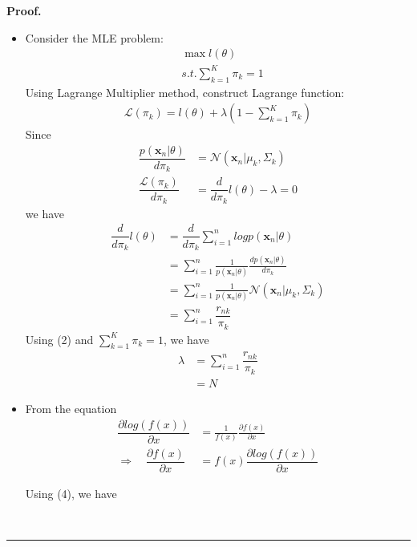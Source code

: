 \documentclass[12pt]{article}%
\newenvironment{proof}[1][Proof]{\textbf{#1.} }{\ \rule{0.5em}{0.5em}}
\begin{document}
\begin{itemize}
\begin{proof}
\begin{itemize}
    		\item Consider the MLE problem:
    		\begin{align*}
    			&\max l(\theta) \\
    			&s.t. \sum_{k=1}^{K} \pi_k=1
    		\end{align*}
    		Using Lagrange Multiplier method, construct Lagrange function:
    		\begin{align*}
    		\mathcal{L}(\pi_k) = l(\theta) + \lambda(1-\sum_{k=1}^{K}\pi_k) 
    		\end{align*}
    		Since 
    		\begin{align}
    		\dfrac{p(\mathbf{x}_n|\theta)}{d\pi_k} &= \mathcal{N}(\mathbf{x}_n|\mu_k, \Sigma_k) \\
    		\dfrac{\mathcal{L}(\pi_k)}{d\pi_k} &= \dfrac{d}{d\pi_k}l(\theta) - \lambda =0 
    		\end{align}
    		we have
    		\begin{align*}
    		\dfrac{d}{d\pi_k}l(\theta) 
    		&= \dfrac{d}{d\pi_k} \sum_{i=1}^{n} logp(\mathbf{x}_n|\theta) \\
    		&= \sum_{i=1}^{n} \frac{1}{p(\mathbf{x}_n|\theta)} \frac{d p(\mathbf{x}_n|\theta)}{d\pi_k} \\
    		&= \sum_{i=1}^{n} \frac{1}{p(\mathbf{x}_n|\theta)} \mathcal{N}(\mathbf{x}_n|\mu_k, \Sigma_k) \\
    		&= \sum_{i=1}^{n} \dfrac{r_{nk}}{\pi_k}
    		\end{align*}
    		Using (2) and $\sum_{k=1}^{K}\pi_k=1$, we have
    		\begin{align*}
    		\lambda &=\sum_{i=1}^{n} \dfrac{r_{nk}}{\pi_k} \\
    		&= N
    		\end{align*}
    		
    		
    		\item From the equation
    		\begin{align}
    			\dfrac{\partial log(f(x))}{\partial x} &= \frac{1}{f(x)} \frac{\partial f(x)}{\partial x} \\
    			\Rightarrow \quad \dfrac{\partial f(x)}{\partial x} &= f(x)\dfrac{\partial log(f(x))}{\partial x}
    		\end{align}
    		
    		Using (4), we have
    		

\end{itemize}
\end{proof}
\end{itemize}
\end{document}
